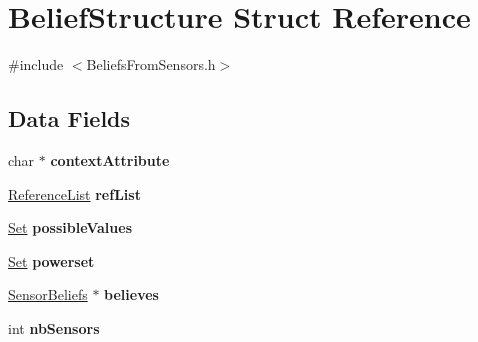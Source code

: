 \hypertarget{struct_belief_structure}{
\section{BeliefStructure Struct Reference}
\label{struct_belief_structure}
}


{\ttfamily \#include $<$BeliefsFromSensors.h$>$}

\subsection*{Data Fields}
\begin{DoxyCompactItemize}
\item 
\hypertarget{struct_belief_structure_abda30f5072e296ecb576bb168b274dfc}{
char $\ast$ {\bfseries contextAttribute}}
\label{struct_belief_structure_abda30f5072e296ecb576bb168b274dfc}

\item 
\hypertarget{struct_belief_structure_a9e6ca02dc7aaabc96de589b5c7bcb99c}{
\hyperlink{struct_reference_list}{ReferenceList} {\bfseries refList}}
\label{struct_belief_structure_a9e6ca02dc7aaabc96de589b5c7bcb99c}

\item 
\hypertarget{struct_belief_structure_a329d320fe175d571a90316b791dd19f4}{
\hyperlink{struct_set}{Set} {\bfseries possibleValues}}
\label{struct_belief_structure_a329d320fe175d571a90316b791dd19f4}

\item 
\hypertarget{struct_belief_structure_aba8e8435aca2a463a5ce6397b30a312c}{
\hyperlink{struct_set}{Set} {\bfseries powerset}}
\label{struct_belief_structure_aba8e8435aca2a463a5ce6397b30a312c}

\item 
\hypertarget{struct_belief_structure_acf801ab3729a6172e45f46561907f187}{
\hyperlink{struct_sensor_beliefs}{SensorBeliefs} $\ast$ {\bfseries believes}}
\label{struct_belief_structure_acf801ab3729a6172e45f46561907f187}

\item 
\hypertarget{struct_belief_structure_a24ec5da519b25f42047e73ec9093a6a8}{
int {\bfseries nbSensors}}
\label{struct_belief_structure_a24ec5da519b25f42047e73ec9093a6a8}

\end{DoxyCompactItemize}



